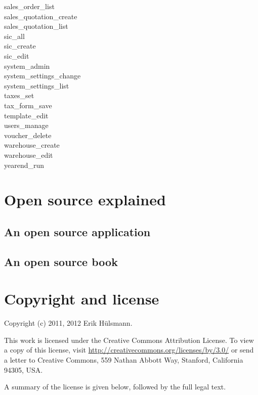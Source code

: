 \begin{description}
\item [sales\_order\_list]
\item [sales\_quotation\_create]
\item [sales\_quotation\_list]
\item [sic\_all]
\item [sic\_create]
\item [sic\_edit]
\item [system\_admin]
\item [system\_settings\_change]
\item [system\_settings\_list]
\item [taxes\_set]
\item [tax\_form\_save]
\item [template\_edit]
\item [users\_manage]
\item [voucher\_delete]
\item [warehouse\_create]
\item [warehouse\_edit]
\item [yearend\_run]
\end{description}

\chapter{Open source explained}

\section{An open source application}

\section{An open source book}


\chapter{Copyright and license}

Copyright (c) 2011, 2012 Erik H\"ulsmann.


This work is licensed under the Creative Commons Attribution License.
To view a copy of this license, visit \url{http://creativecommons.org/licenses/by/3.0/}
or send a letter to Creative Commons, 559 Nathan Abbott Way,
Stanford, California 94305, USA.

A summary of the license is given below, followed by the full legal text.

